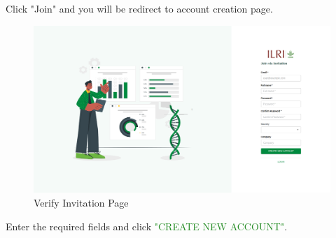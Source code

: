 Click "Join" and you will be redirect to account creation page.
\begin{figure}[h!]
  	\includegraphics[width=15cm]{screenshots/verify_invitation_page.png}
  	\caption{Verify Invitation Page}
  	\label{fig:verify_invitation_page}
\end{figure}
Enter the required fields and click \textcolor{ForestGreen}{"CREATE NEW ACCOUNT"}.
